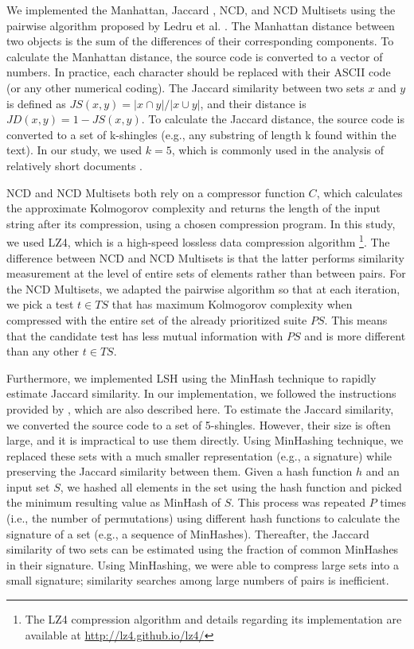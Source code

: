 \documentclass[runningheads]{llncs}
\begin{document}
We implemented the Manhattan, Jaccard , NCD, and NCD Multisets using the pairwise algorithm proposed by Ledru et al. \cite{ledru2012prioritizing}. The Manhattan distance between two objects is the sum of the differences of their corresponding components. To calculate the Manhattan distance, the source code is converted to a vector of numbers. In practice, each character should be replaced with their ASCII code (or any other numerical coding). The Jaccard similarity between two sets $x$ and $y$ is defined as $JS(x,y)= |x \cap y|/|x \cup y|$, and their distance is $JD(x, y) = 1- JS(x, y)$. To calculate the Jaccard distance, the source code is converted to a set of k-shingles (e.g., any substring of length k found within the text). In our study, we used $k=5$, which is commonly used in the analysis of relatively short documents \cite{leskovec2014mining}.

NCD and NCD Multisets both rely on a compressor function $C$, which calculates the approximate Kolmogorov complexity and returns the length of the input string after its compression, using a chosen compression program. In this study, we used LZ4, which is a high-speed lossless data compression algorithm \footnote{The LZ4 compression algorithm and details regarding its implementation are available at \url{http://lz4.github.io/lz4/}}. The difference between NCD and NCD Multisets is that the latter performs similarity measurement at the level of entire sets of elements rather than between pairs. For the NCD Multisets, we adapted the pairwise algorithm so that at each iteration, we pick a test $t\in TS$ that has maximum Kolmogorov complexity when compressed with the entire set of the already prioritized suite $PS$. This means that the candidate test has less mutual information with $PS$ and is more different than any other $t\in TS$.

Furthermore, we implemented LSH using the MinHash technique to rapidly estimate Jaccard similarity. In our implementation, we followed the instructions provided by \cite{leskovec2014mining}, which are also described here. To estimate the Jaccard similarity, we converted the source code to a set of 5-shingles. However, their size is often large, and it is impractical to use them directly. Using MinHashing technique, we replaced these sets with a much smaller representation (e.g., a signature) while preserving the Jaccard similarity between them. Given a hash function $h$ and an input set $S$, we hashed all elements in the set using the hash function and picked the minimum resulting value as MinHash of $S$. This process was repeated $P$ times (i.e., the number of permutations) using different hash functions to calculate the signature of a set (e.g., a sequence of MinHashes). Thereafter, the Jaccard similarity of two sets can be estimated using the fraction of common MinHashes in their signature. Using MinHashing, we were able to compress large sets into a small signature; similarity searches among large numbers of pairs is inefficient.
\end{document}
